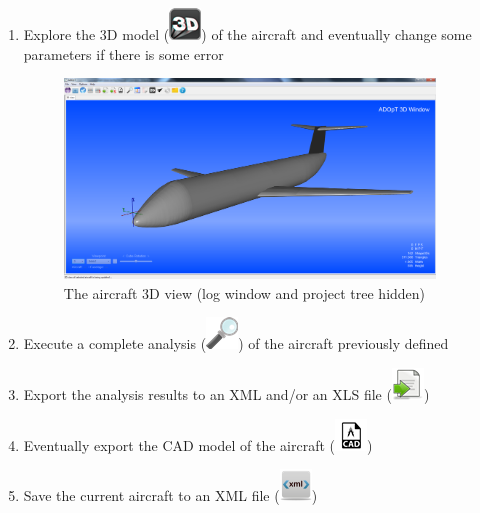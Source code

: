 \begin{enumerate}
	\item Explore the 3D model \big(\includegraphics[scale=1.2]{images/gui/icons/3DView_32x32.png}\big) of the aircraft and eventually change some parameters if there is some error
	\begin{figure}[h]
		\includegraphics[width=0.93\textwidth,right]{images/gui/explore3D}
		\caption{The aircraft 3D view (log window and project tree hidden)}
	\end{figure}
	
	\item Execute a complete analysis \big(\includegraphics[scale=0.5]{images/gui/icons/analysis_32x32.png}\big) of the aircraft previously defined

	\item Export the analysis results to an XML and/or an XLS file \big(\includegraphics[scale=0.4]{images/gui/icons/Export_32x32.png}\big)
	
	\item Eventually export the CAD model of the aircraft \big(\includegraphics[scale=1.2]{images/gui/icons/cad_32x32.png}\big)
	
	\item Save the current aircraft to an XML file \big(\includegraphics[scale=0.4]{images/gui/icons/XML_32x32.png}\big)
\end{enumerate}
